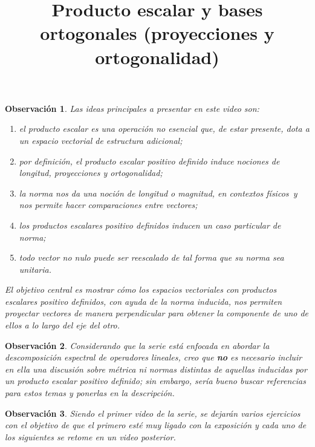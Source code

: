 \documentclass[12pt,dvipsnames]{article}
\newtheorem{obs}{Observación}[section]
\numberwithin{equation}{section}
\begin{document}
\title{Producto escalar y bases ortogonales (proyecciones y ortogonalidad)}
\date{}
\maketitle

\begin{obs}

Las ideas principales a presentar en este video son:
\begin{enumerate}[label=(\roman*)]
    
    \item el producto escalar es una operación no esencial que, de estar presente, dota a un espacio vectorial de estructura adicional;
    
    \item por definición, el producto escalar positivo definido induce nociones de longitud, proyecciones y ortogonalidad;
    
    \item la norma nos da una noción de longitud \textemdash o magnitud, en contextos físicos\textemdash \ y nos permite hacer comparaciones entre vectores;
    
    \item los productos escalares positivo definidos inducen un caso particular de norma;
    
    \item todo vector no nulo puede ser reescalado de tal forma que su norma sea unitaria.
\end{enumerate}

El objetivo central es mostrar cómo los espacios vectoriales con productos escalares positivo definidos, con ayuda de la norma inducida, nos permiten proyectar vectores de manera perpendicular para obtener la componente de uno de ellos a lo largo del eje del otro.
\end{obs}

\begin{obs}
Considerando que la serie está enfocada en abordar la descomposición espectral de operadores lineales, creo que \textbf{no} es necesario incluir en ella una discusión sobre métrica ni normas distintas de aquellas inducidas por un producto escalar positivo definido; sin embargo, sería bueno buscar referencias para estos temas y ponerlas en la descripción.
\end{obs}

\begin{obs}
Siendo el primer video de la serie, se dejarán varios ejercicios con el objetivo de que el primero esté muy ligado con la exposición y cada uno de los siguientes se retome en un video posterior.
\end{obs}
\end{document}
